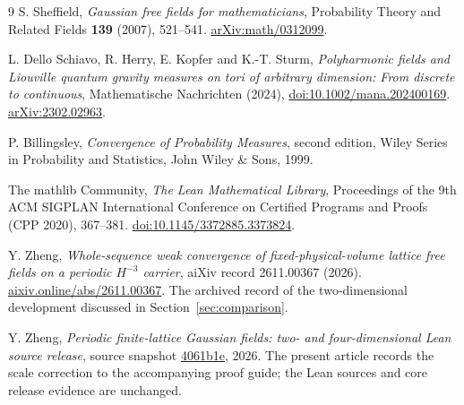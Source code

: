 \begin{thebibliography}{9}
S. Sheffield, \emph{Gaussian free fields for mathematicians},
Probability Theory and Related Fields \textbf{139} (2007), 521--541.
\href{https://arxiv.org/abs/math/0312099}{arXiv:math/0312099}.

L. Dello Schiavo, R. Herry, E. Kopfer and K.-T. Sturm,
\emph{Polyharmonic fields and Liouville quantum gravity measures on tori of
arbitrary dimension: From discrete to continuous},
Mathematische Nachrichten (2024),
\href{https://doi.org/10.1002/mana.202400169}{doi:10.1002/mana.202400169}.
\href{https://arxiv.org/abs/2302.02963}{arXiv:2302.02963}.

P. Billingsley, \emph{Convergence of Probability Measures}, second edition,
Wiley Series in Probability and Statistics, John Wiley \& Sons, 1999.

The mathlib Community, \emph{The Lean Mathematical Library},
Proceedings of the 9th ACM SIGPLAN International Conference on Certified
Programs and Proofs (CPP 2020), 367--381.
\href{https://doi.org/10.1145/3372885.3373824}{doi:10.1145/3372885.3373824}.

Y. Zheng,
\emph{Whole-sequence weak convergence of fixed-physical-volume lattice free
fields on a periodic $H^{-3}$ carrier}, aiXiv record 2611.00367 (2026).
\href{https://aixiv.online/abs/2611.00367}{aixiv.online/abs/2611.00367}.
The archived record of the two-dimensional development discussed in
Section~\ref{sec:comparison}.

Y. Zheng, \emph{Periodic finite-lattice Gaussian fields: two- and
four-dimensional Lean source release}, source snapshot
\href{https://github.com/springoxn/pphi2-clean-finite-lattice/tree/4061b1eb41aa20037734e6f759fdab654be27eca}{4061b1e}, 2026.
The present article records the scale correction to the accompanying
proof guide; the Lean sources and core release evidence are unchanged.
\end{thebibliography}
